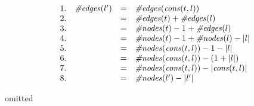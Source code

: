 \documentclass[]{exam}
\begin{document}
\begin{questions}
\begin{displaymath}
\begin{array}{llll}
1. & \mbox{\it \#edges\/}(l') & = &\mbox{\it \#edges\/}(\mbox{\it cons\/}(t,l)) \\
2. &  & = & \mbox{\it \#edges\/}(t) + \mbox{\it \#edges\/}(l) \\
3. & 	& = & \mbox{\it \#nodes\/}(t) - 1 + \mbox{\it \#edges\/}(l) \\
4. & 	& = & \mbox{\it \#nodes\/}(t) - 1 + \mbox{\it \#nodes\/}(l) - |l| \\
5. & 	& = & \mbox{\it \#nodes\/}(\mbox{\it cons\/}(t,l)) - 1 - |l| \\
6. & 	& = & \mbox{\it \#nodes\/}(\mbox{\it cons\/}(t,l)) - (1 + |l|) \\
7. & 	& = & \mbox{\it \#nodes\/}(\mbox{\it cons\/}(t,l)) - |\mbox{\it cons\/}(t,l)|\\
8. & 	& = & \mbox{\it \#nodes\/}(l') - |l'|
\end{array}
\end{displaymath}
\begin{solution}
omitted
\end{solution}

%
%
%
%



\end{questions}
\end{document}
